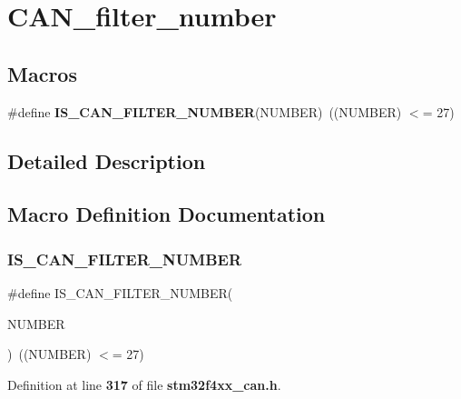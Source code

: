 \section{C\+A\+N\+\_\+filter\+\_\+number}
\label{group__CAN__filter__number}
\subsection*{Macros}
\begin{DoxyCompactItemize}
\item 
\#define \textbf{ I\+S\+\_\+\+C\+A\+N\+\_\+\+F\+I\+L\+T\+E\+R\+\_\+\+N\+U\+M\+B\+ER}(N\+U\+M\+B\+ER)~((N\+U\+M\+B\+ER) $<$= 27)
\end{DoxyCompactItemize}


\subsection{Detailed Description}


\subsection{Macro Definition Documentation}
\mbox{\label{group__CAN__filter__number_ga28d6c98a160d71059ed9a5973de2a4ef}} 
\subsubsection{I\+S\+\_\+\+C\+A\+N\+\_\+\+F\+I\+L\+T\+E\+R\+\_\+\+N\+U\+M\+B\+ER}
{\footnotesize\ttfamily \#define I\+S\+\_\+\+C\+A\+N\+\_\+\+F\+I\+L\+T\+E\+R\+\_\+\+N\+U\+M\+B\+ER(\begin{DoxyParamCaption}\item[{}]{N\+U\+M\+B\+ER }\end{DoxyParamCaption})~((N\+U\+M\+B\+ER) $<$= 27)}



Definition at line \textbf{ 317} of file \textbf{ stm32f4xx\+\_\+can.\+h}.

